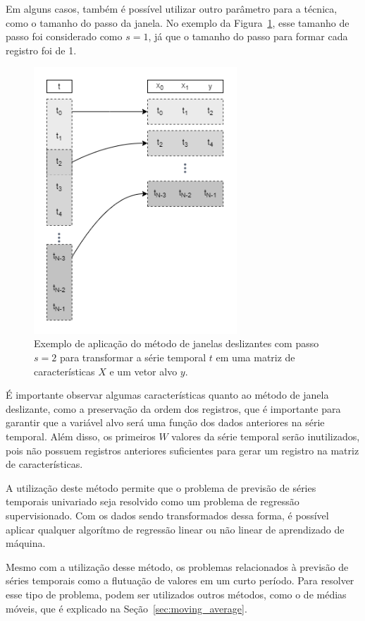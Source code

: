 Em alguns casos, também é possível utilizar outro parâmetro para a técnica, como o tamanho do passo da janela. No exemplo da Figura~\ref{fig:sliding_window_2}, esse tamanho de passo foi considerado como $s=1$, já que o tamanho do passo para formar cada registro foi de 1.

\begin{figure}[!htp] \label{fig:sliding_window_2}
    \centering
    \includegraphics[width=3.0in]{img/sliding_window_2.png}
    \caption{Exemplo de aplicação do método de janelas deslizantes com passo $s=2$  para transformar a série temporal $t$ em uma matriz de características $X$ e um vetor alvo $y$. }
\end{figure}

É importante observar algumas características quanto ao método de janela deslizante, como a preservação da ordem dos registros, que é importante para garantir que a variável alvo será uma função dos dados anteriores na série temporal. Além disso, os primeiros $W$ valores da série temporal serão inutilizados, pois não possuem registros anteriores suficientes para gerar um registro na matriz de características.

A utilização deste método permite que o problema de previsão de séries temporais univariado seja resolvido como um problema de regressão supervisionado. Com os dados sendo transformados dessa forma, é possível aplicar qualquer algorítmo de regressão linear ou não linear de aprendizado de máquina.

Mesmo com a utilização desse método, os problemas relacionados à previsão de séries temporais como a flutuação de valores em um curto período. Para resolver esse tipo de problema, podem ser utilizados outros métodos, como o de médias móveis, que é explicado na Seção~\ref{sec:moving_average}.


